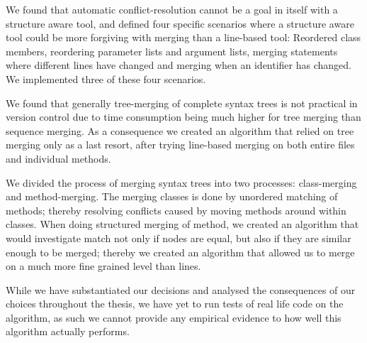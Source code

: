 \documentclass[11pt]{article}
\begin{document}
We found that automatic conflict-resolution cannot be a goal in itself with a structure aware tool, and defined four specific scenarios where a structure aware tool could be more forgiving with merging than a line-based tool: Reordered class members, reordering parameter lists and argument lists, merging statements where different lines have changed and merging when an identifier has changed. We implemented three of these four scenarios.

We found that generally tree-merging of complete syntax trees is not practical in version control due to time consumption being much higher for tree merging than sequence merging. As a consequence we created an algorithm that relied on tree merging only as a last resort, after trying line-based merging on both entire files and individual methods.

We divided the process of merging syntax trees into two processes: class-merging and method-merging. The merging classes is done by unordered matching of methods; thereby resolving conflicts caused by moving methods around within classes. When doing structured merging of method, we created an algorithm that would investigate match not only if nodes are equal, but also if they are similar enough to be merged; thereby we created an algorithm that allowed us to merge on a much more fine grained level than lines.

While we have substantiated our decisions and analysed the consequences of our choices throughout the thesis, we have yet to run tests of real life code on the algorithm, as such we cannot provide any empirical evidence to how well this algorithm actually performs.

\clearpage

\listofalgorithms

\clearpage



\end{document}
